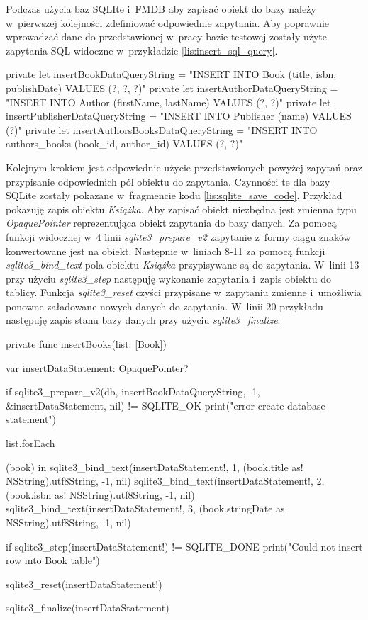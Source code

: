 Podczas użycia baz SQLIte i~FMDB aby zapisać obiekt do bazy należy w~pierwszej kolejności zdefiniować odpowiednie zapytania. Aby poprawnie wprowadzać dane do przedstawionej w~pracy bazie testowej zostały użyte zapytania SQL widoczne w~przykładzie \ref{lis:insert_sql_query}. 

\begin{code}[
		language=swift,
		caption={Zapytania SQL do wprowadzania danych},
		label={lis:insert_sql_query},
	]
    private let insertBookDataQueryString = "INSERT INTO Book (title, isbn, publishDate) VALUES (?, ?, ?)"
    private let insertAuthorDataQueryString = "INSERT INTO Author (firstName, lastName) VALUES (?, ?)"
    private let insertPublisherDataQueryString = "INSERT INTO Publisher (name) VALUES (?)"
    private let insertAuthorsBooksDataQueryString = "INSERT INTO authors_books (book_id, author_id) VALUES (?, ?)"
\end{code}

Kolejnym krokiem jest odpowiednie użycie przedstawionych powyżej zapytań oraz przypisanie odpowiednich pól obiektu do zapytania. Czynności te dla bazy SQLite zostały pokazane w~fragmencie kodu \ref{lis:sqlite_save_code}. Przykład pokazuję zapis obiektu \textit{Książka}. Aby zapisać obiekt niezbędna jest zmienna typu \textit{OpaquePointer} reprezentująca obiekt zapytania do bazy danych. Za pomocą funkcji widocznej w~4 linii \textit{sqlite3\_prepare\_v2} zapytanie z~formy ciągu znaków konwertowane jest na obiekt. Następnie w~liniach 8-11 za pomocą funkcji \textit{sqlite3\_bind\_text} pola obiektu \textit{Książka} przypisywane są do zapytania. W~linii 13 przy użyciu \textit{sqlite3\_step} następuję wykonanie zapytania i~zapis obiektu do tablicy. Funkcja \textit{sqlite3\_reset} czyści przypisane w~zapytaniu zmienne i~umożliwia ponowne załadowane nowych danych do zapytania. W~linii 20 przykładu następuję zapis stanu bazy danych przy użyciu \textit{sqlite3\_finalize}.

\begin{code}[
		language=swift,
		caption={Przykład zapisu obiektu SQLIte},
		label={lis:sqlite_save_code},
	]
    private func insertBooks(list: [Book]) {
        var insertDataStatement: OpaquePointer?
        
        if sqlite3_prepare_v2(db, insertBookDataQueryString, -1, &insertDataStatement, nil) != SQLITE_OK {
            print("error create database statement")
        }
        
        list.forEach { (book) in
            sqlite3_bind_text(insertDataStatement!, 1, (book.title as! NSString).utf8String, -1, nil)
            sqlite3_bind_text(insertDataStatement!, 2, (book.isbn as! NSString).utf8String, -1, nil)
            sqlite3_bind_text(insertDataStatement!, 3, (book.stringDate as NSString).utf8String, -1, nil)
            
            if sqlite3_step(insertDataStatement!) != SQLITE_DONE {
                print("Could not insert row into Book table")
            }
            
            sqlite3_reset(insertDataStatement!)
        }
        
        sqlite3_finalize(insertDataStatement)
    }
\end{code}

